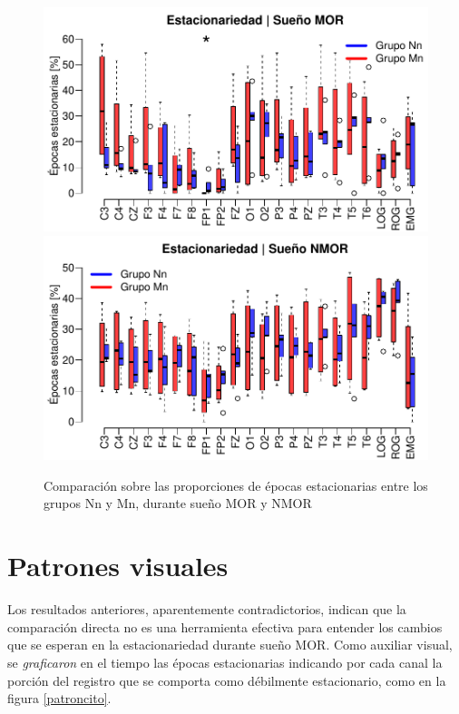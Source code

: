 \begin{figure}
\centering
\includegraphics[width=\linewidth]
{./img_ejemplos/Comparacion_gpos_MOR_v2.pdf} \\
\includegraphics[width=\linewidth]
{./img_ejemplos/Comparacion_gpos_NMOR_v2.pdf}
\caption{Comparación sobre las proporciones de épocas estacionarias entre los grupos Nn y Mn, 
durante sueño MOR y NMOR}
\label{comparacion_graf}
\end{figure}


\section{Patrones visuales}

Los resultados anteriores, aparentemente contradictorios, indican que la comparación directa no es 
una herramienta efectiva para entender los cambios que se esperan en la estacionariedad durante
sueño MOR.
Como auxiliar visual, se \textit{graficaron} en el tiempo las épocas
estacionarias indicando por cada canal la porción del registro que se comporta como débilmente 
estacionario, como en la figura \ref{patroncito}.

